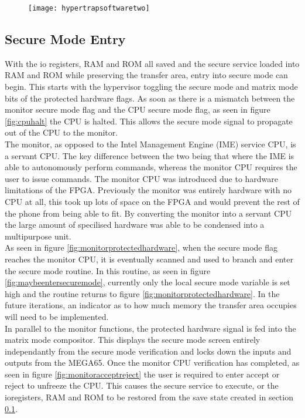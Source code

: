 \begin{figure}
  \centering
  \texttt{[image: hypertrapsoftwaretwo]}
  \caption{}
  \label{fig:hypertrapsoftwaretwo}
\end{figure}


\subsection{Secure Mode Entry}

\label{Ch6 Sec3 Sub3}

With the io registers, RAM and ROM all saved and the secure service loaded into RAM and ROM while preserving the transfer area, entry into secure mode can begin. This starts with the hypervisor toggling the secure mode and matrix mode bits of the protected hardware flags. As soon as there is a mismatch between the monitor secure mode flag and the CPU secure mode flag, as seen in figure \ref{fig:cpuhalt} the CPU is halted. This allows the secure mode signal to propagate out of the CPU to the monitor.\\

The monitor, as opposed to the Intel Management Engine (IME) service CPU, is a servant CPU. The key difference between the two being that where the IME is able to autonomously perform commands, whereas the monitor CPU requires the user to issue commands. The monitor CPU was introduced due to hardware limitations of the FPGA. Previously the monitor was entirely hardware with no CPU at all, this took up lots of space on the FPGA and would prevent the rest of the phone from being able to fit. By converting the monitor into a servant CPU the large amount of specilised hardware was able to be condensed into a multipurpose unit.\\

As seen in figure \ref{fig:monitorprotectedhardware}, when the secure mode flag reaches the monitor CPU, it is eventually scanned and used to branch and enter the secure mode routine. In this routine, as seen in figure \ref{fig:maybeentersecuremode}, currently only the local secure mode variable is set high and the routine returns to figure \ref{fig:monitorprotectedhardware}. In the future iterations, an indicator as to how much memory the transfer area occupies will need to be implemented.\\

In parallel to the monitor functions, the protected hardware signal is fed into the matrix mode compositor. This displays the secure mode screen entirely independantly from the secure mode verification and locks down the inputs and outputs from the MEGA65. Once the monitor CPU verification has completed, as seen in figure \ref{fig:monitoracceptreject} the user is required to enter accept or reject to unfreeze the CPU. This causes the secure service to execute, or the ioregisters, RAM and ROM to be restored from the save state created in section \ref{Ch6 Sec3 Sub3}.

